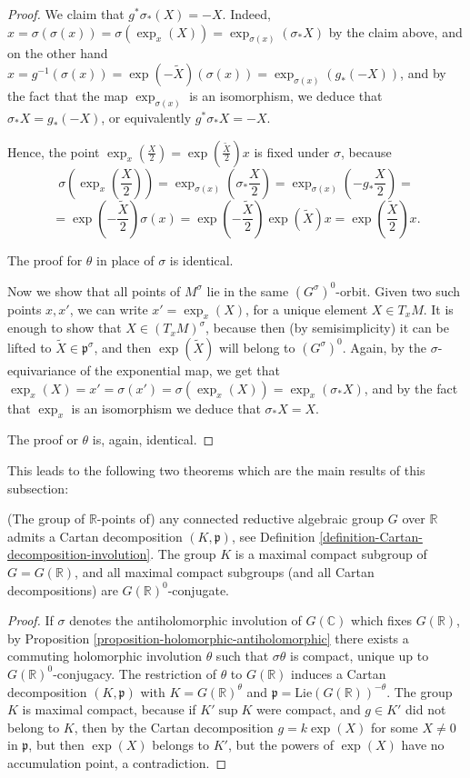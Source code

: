 \begin{proof}
We claim that $g^*\sigma_*(X) = -X$. Indeed, $x = \sigma(\sigma(x)) =\sigma (\exp_x (X)) = \exp_{\sigma(x)} (\sigma_* X)$ by the claim above, and on the other hand $x = g^{-1}(\sigma(x)) = \exp(-\tilde X) (\sigma (x)) = \exp_{\sigma(x)} (g_*(-X))$, and by the fact that the map $\exp_{\sigma(x)}$ is an isomorphism, we deduce that $\sigma_* X = g_*(-X)$, or equivalently $g^*\sigma_* X = -X$.

Hence, the point $\exp_x (\frac{X}{2}) = \exp(\frac{\tilde X}{2}) x$ is fixed under $\sigma$, because 
$$\sigma (\exp_x (\frac{X}{2})) = \exp_{\sigma(x)} (\sigma_* \frac{X}{2}) = \exp_{\sigma(x)} (- g_* \frac{X}{2})=$$
$$= \exp(-\frac{\tilde X}{2}) \sigma (x) = \exp(-\frac{\tilde X}{2}) \exp(\tilde X) x = \exp(\frac{\tilde X}{2}) x.$$ 

The proof for $\theta$ in place of $\sigma$ is identical. 


Now we show that all points of $M^\sigma$ lie in the same $(G^\sigma)^0$-orbit. Given two such points $x, x'$, we can write $x' = \exp_x(X)$, for a unique element $X\in T_x M$. It is enough to show that $X \in (T_x M)^\sigma$, because then (by semisimplicity) it can be lifted to $\tilde X \in \mathfrak p^\sigma$, and then $\exp(\tilde X)$ will belong to $(G^\sigma)^0$. Again, by the $\sigma$-equivariance of the exponential map, we get that $\exp_x(X) = x' = \sigma(x') = \sigma(\exp_x(X)) = \exp_x (\sigma_* X)$, and by the fact that $\exp_x$ is an isomorphism we deduce that $\sigma_*X = X$.

The proof or $\theta$ is, again, identical.

\end{proof}

This leads to the following two theorems which are the main results of this subsection:

\begin{theorem}
 \label{theorem-Cartan-involution-exists}
(The group of $\mathbb R$-points of) any connected reductive algebraic group $G$ over $\mathbb R$ admits a Cartan decomposition $(K,\mathfrak p)$, see Definition \ref{definition-Cartan-decomposition-involution}. The group $K$ is a maximal compact subgroup of $G=G(\mathbb R)$, and all maximal compact subgroups (and all Cartan decompositions) are $G(\mathbb R)^0$-conjugate. 
\end{theorem}

\begin{proof}
 If $\sigma$ denotes the antiholomorphic involution of $G(\mathbb C)$ which fixes $G(\mathbb R)$, by  Proposition \ref{proposition-holomorphic-antiholomorphic} there exists a commuting holomorphic involution $\theta$ such that $\sigma\theta$ is compact, unique up to $G(\mathbb R)^0$-conjugacy. The restriction of $\theta$ to $G(\mathbb R)$ induces a Cartan decomposition $(K, \mathfrak p)$ with $K = G(\mathbb R)^\theta$ and $\mathfrak p = \text{Lie}(G(\mathbb R))^{-\theta}$. The group $K$ is maximal compact, because if $K'\sup K$ were compact, and $g \in K'$ did not belong to $K$, then by the Cartan decomposition $g = k\exp(X)$ for some $X\ne 0$ in $\mathfrak p$, but then $\exp(X)$ belongs to $K'$, but the powers of $\exp(X)$ have no accumulation point, a contradiction.
\end{proof}

